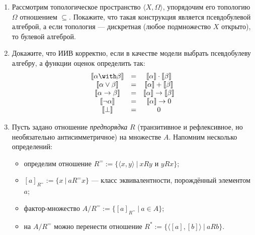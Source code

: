 \begin{enumerate}
      \item Рассмотрим топологическое пространство $\langle X, \Omega \rangle$, упорядочим его топологию $\Omega$ отношением $\subseteq$.
            Покажите, что такая конструкция является псевдобулевой алгеброй, а если топология --- дискретная (любое подмножество $X$ открыто),
            то булевой алгеброй.

      \item Докажите, что ИИВ корректно, если в качестве модели выбрать псевдобулеву алгебру, а функции оценок определить так:
            $$\begin{array}{ccc}
                        \llbracket\alpha \with \beta\rrbracket       & = & \llbracket\alpha\rrbracket \cdot \llbracket\beta\rrbracket       \\
                        \llbracket\alpha \vee \beta\rrbracket        & = & \llbracket\alpha\rrbracket + \llbracket\beta\rrbracket           \\
                        \llbracket\alpha \rightarrow \beta\rrbracket & = & \llbracket\alpha\rrbracket \rightarrow \llbracket\beta\rrbracket \\
                        \llbracket\neg\alpha\rrbracket               & = & \llbracket\alpha\rrbracket \rightarrow 0                         \\
                        \llbracket\bot\rrbracket                     & = & 0                                                                \\
                  \end{array}$$

      \item Пусть задано отношение \emph{предпорядка} $R$ (транзитивное и рефлексивное, но необязательно антисимметричное) на множестве $A$.
            Напомним несколько определений:
            \begin{itemize}
                  \item определим отношение $R^= := \{ \langle x,y \rangle\ |\ xRy \text{ и } yRx \}$;
                  \item $[a]_{R^=} := \{ x\ |\ aR^=x \}$ --- класс эквивалентности, порождённый элементом $a$;
                  \item фактор-множество $A/{R^=} := \{ [a]_{R^=}\ |\ a \in A \}$;
                  \item на $A/{R^=}$ можно перенести отношение $R^* := \{ \langle [a],[b] \rangle\ |\ aRb \}$.
            \end{itemize}


\end{enumerate}
